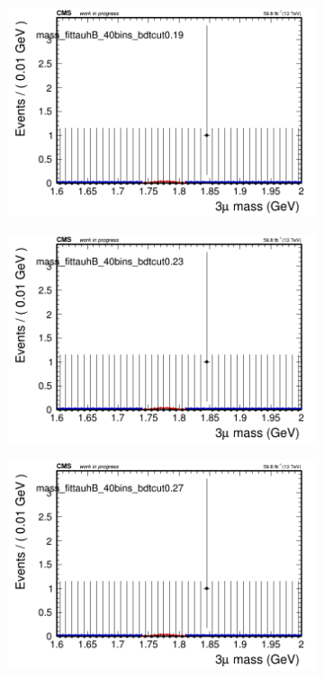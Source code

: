 \begin{figure}[H]
\begin{subfigure}{0.2\textwidth}
        \caption{}
    \end{subfigure}
    \begin{subfigure}{0.2\textwidth}
        \includegraphics[width=\textwidth]{flat_fit/plots/tauhB/massfit_tauhB_40bins_bdtcut0.19.png}
        \caption{}
    \end{subfigure}
    \begin{subfigure}{0.2\textwidth}
        \includegraphics[width=\textwidth]{flat_fit/plots/tauhB/massfit_tauhB_40bins_bdtcut0.23.png}
        \caption{}
    \end{subfigure}
    \begin{subfigure}{0.2\textwidth}
        \includegraphics[width=\textwidth]{flat_fit/plots/tauhB/massfit_tauhB_40bins_bdtcut0.27.png}

\end{subfigure}
\end{figure}
